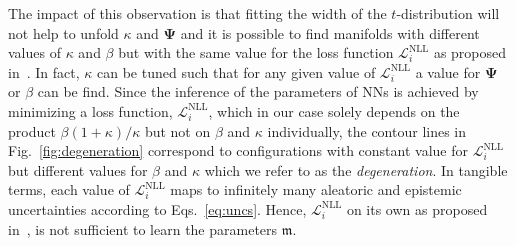 \documentclass{article}
\begin{document}
The impact of this observation is that fitting the width of the $t$-distribution will not help to unfold $\kappa$ and $\bm{\Psi}$ and it is possible to find manifolds with different values of $\kappa$ and $\beta$ but with the same value for the loss function $\mathcal{L}_i^\text{NLL}$ as proposed in~\cite{amini20}.
In fact, $\kappa$ can be tuned such that for any given value of $\mathcal{L}_i^\text{NLL}$ a value for $\bm{\Psi}$ or $\beta$ can be find.
Since the inference of the parameters of NNs is achieved by minimizing a loss function, $\mathcal{L}_i^\text{NLL}$, which in our case solely depends on the product $\beta (1 + \kappa) / \kappa$ but not on $\beta$ and $\kappa$ individually, the contour lines in Fig.~\ref{fig:degeneration} correspond to configurations with constant value for $\mathcal{L}_i^\text{NLL}$ but different values for $\beta$ and $\kappa$ which we refer to as the \textit{degeneration}.
In tangible terms, each value of $\mathcal{L}_i^\text{NLL}$ maps to infinitely many aleatoric and epistemic uncertainties according to Eqs.~\eqref{eq:uncs}.
Hence, $\mathcal{L}_i^\text{NLL}$ on its own as proposed in~\cite{amini20}, is not sufficient to learn the parameters $\mathfrak{m}$.

\newpage
\end{document}
